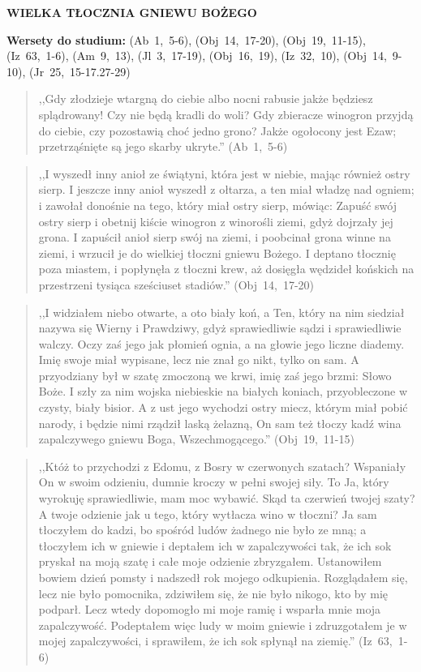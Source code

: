 \documentclass[10pt,a4paper,oneside]{article}
\begin{document}
\centerline{\textbf{\MakeUppercase{Wielka tłocznia gniewu Bożego}}}
\begin{center}
\textbf{Wersety do studium:} (Ab~1,~5-6), (Obj~14,~17-20), (Obj~19,~11-15), (Iz~63,~1-6), (Am~9,~13), (Jl~3,~17-19), (Obj~16,~19), (Iz~32,~10), (Obj~14,~9-10), (Jr~25,~15-17.27-29)
\end{center}
\begin{quote}
,,Gdy złodzieje wtargną do ciebie albo nocni rabusie jakże będziesz splądrowany! Czy nie będą kradli do woli? Gdy zbieracze winogron przyjdą do ciebie, czy pozostawią choć jedno grono? Jakże ogołocony jest Ezaw; przetrząśnięte są jego skarby ukryte.'' (Ab~1,~5-6)
\end{quote}
\begin{quote}
,,I wyszedł inny anioł ze świątyni, która jest w niebie, mając również ostry sierp. I jeszcze inny anioł wyszedł z ołtarza, a ten miał władzę nad ogniem; i zawołał donośnie na tego, który miał ostry sierp, mówiąc: Zapuść swój ostry sierp i obetnij kiście winogron z winorośli ziemi, gdyż dojrzały jej grona. I zapuścił anioł sierp swój na ziemi, i poobcinał grona winne na ziemi, i wrzucił je do wielkiej tłoczni gniewu Bożego. I deptano tłocznię poza miastem, i popłynęła z tłoczni krew, aż dosięgła wędzideł końskich na przestrzeni tysiąca sześciuset stadiów.'' (Obj~14,~17-20)
\end{quote}
\begin{quote}
,,I widziałem niebo otwarte, a oto biały koń, a Ten, który na nim siedział nazywa się Wierny i Prawdziwy, gdyż sprawiedliwie sądzi i sprawiedliwie walczy. Oczy zaś jego jak płomień ognia, a na głowie jego liczne diademy. Imię swoje miał wypisane, lecz nie znał go nikt, tylko on sam. A przyodziany był w szatę zmoczoną we krwi, imię zaś jego brzmi: Słowo Boże. I szły za nim wojska niebieskie na białych koniach, przyobleczone w czysty, biały bisior. A z ust jego wychodzi ostry miecz, którym miał pobić narody, i będzie nimi rządził laską żelazną, On sam też tłoczy kadź wina zapalczywego gniewu Boga, Wszechmogącego.'' (Obj~19,~11-15)
\end{quote}
\begin{quote}
,,Któż to przychodzi z Edomu, z Bosry w czerwonych szatach? Wspaniały On w swoim odzieniu, dumnie kroczy w pełni swojej siły. To Ja, który wyrokuję sprawiedliwie, mam moc wybawić. Skąd ta czerwień twojej szaty? A twoje odzienie jak u tego, który wytłacza wino w tłoczni? Ja sam tłoczyłem do kadzi, bo spośród ludów żadnego nie było ze mną; a tłoczyłem ich w gniewie i deptałem ich w zapalczywości tak, że ich sok pryskał na moją szatę i całe moje odzienie zbryzgałem. Ustanowiłem bowiem dzień pomsty i nadszedł rok mojego odkupienia. Rozglądałem się, lecz nie było pomocnika, zdziwiłem się, że nie było nikogo, kto by mię podparł. Lecz wtedy dopomogło mi moje ramię i wsparła mnie moja zapalczywość. Podeptałem więc ludy w moim gniewie i zdruzgotałem je w mojej zapalczywości, i sprawiłem, że ich sok spłynął na ziemię.'' (Iz~63,~1-6)
\end{quote}
\end{document}

